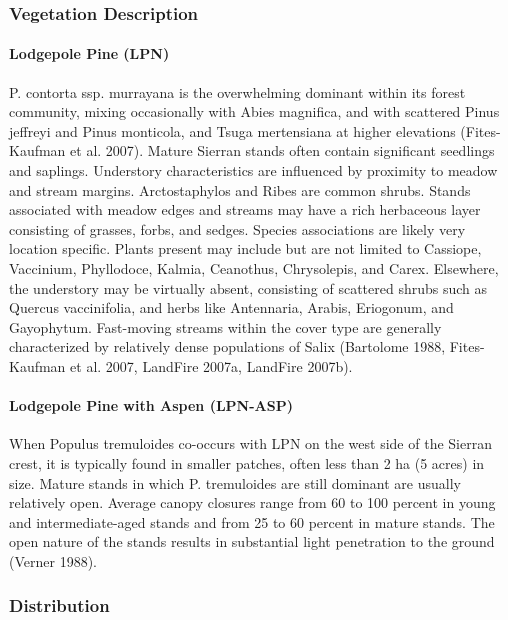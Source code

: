 \subsubsection{Vegetation Description}
\paragraph{Lodgepole Pine (LPN)}	P. contorta ssp. murrayana is the overwhelming dominant within its forest community, mixing occasionally with Abies magnifica, and with scattered Pinus jeffreyi  and Pinus monticola, and Tsuga mertensiana at higher elevations (Fites-Kaufman et al. 2007). Mature Sierran stands often contain significant seedlings and saplings. Understory characteristics are influenced by proximity to meadow and stream margins. Arctostaphylos and Ribes are common shrubs. Stands associated with meadow edges and streams may have a rich herbaceous layer consisting of grasses, forbs, and sedges. Species associations are likely very location specific. Plants present may include but are not limited to Cassiope, Vaccinium, Phyllodoce, Kalmia, Ceanothus, Chrysolepis, and Carex. Elsewhere, the understory may be virtually absent, consisting of scattered shrubs such as Quercus vaccinifolia, and herbs like Antennaria, Arabis, Eriogonum, and Gayophytum. Fast-moving streams within the cover type are generally characterized by relatively dense populations of Salix (Bartolome 1988, Fites-Kaufman et al. 2007, LandFire 2007a, LandFire 2007b).  

\paragraph{Lodgepole Pine with Aspen (LPN-ASP)}	When Populus tremuloides co-occurs with LPN on the west side of the Sierran crest, it is typically found in smaller patches, often less than 2 ha (5 acres) in size. Mature stands in which P. tremuloides are still dominant are usually relatively open. Average canopy closures range from 60 to 100 percent in young and intermediate-aged stands and from 25 to 60 percent in mature stands. The open nature of the stands results in substantial light penetration to the ground (Verner 1988).

\subsubsection{Distribution}
